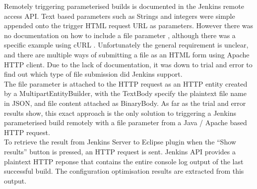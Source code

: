 Remotely triggering parameterised builds is documented in the Jenkins remote access API. \cite{remoteapi} Text based parameters such as Strings and integers were simple appended onto the trigger HTML request URL as parameters. However there was no documentation on how to include a file parameter \cite{pbuild}, although there was a specific example using cURL \cite{remoteapi}. Unfortunately the general requirement is unclear, and there are multiple ways of submitting a file as an HTML form using Apache HTTP client. Due to the lack of documentation, it was down to trial and error to find out which type of file submission did Jenkins support.\\
The file parameter is attached to the HTTP request as an HTTP entity created by a MultipartEntityBuilder, with the TextBody specify the plaintext file name in JSON, and file content attached as BinaryBody. As far as the trial and error results show, this exact approach is the only solution to triggering a Jenkins parameterised build remotely with a file parameter from a Java / Apache based HTTP request.\\
To retrieve the result from Jenkins Server to Eclipse plugin when the ``Show results'' button is pressed, an HTTP request is sent. Jenkins API provides a plaintext HTTP reponse that contains the entire console log output of the last successful build. The configuration optimisation results are extracted from this output.

\newpage
